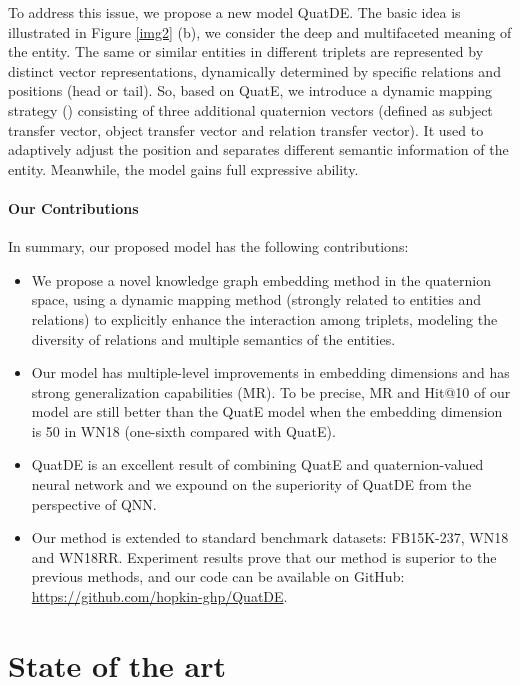 \documentclass[letterpaper]{article} \usepackage{aaai20}  \usepackage{times}  \usepackage{helvet} \usepackage{courier}  \usepackage[hyphens]{url}  \usepackage{graphicx} \usepackage{lineno,hyperref,amsmath,amssymb}
\begin{document}
To address this issue, we propose a new model QuatDE. The basic idea is illustrated in Figure \ref{img2} (b), we consider the deep and multifaceted meaning of the entity. The same or similar entities in different triplets are represented by distinct vector representations, dynamically determined by specific relations and positions (head or tail). So, based on QuatE, we introduce a dynamic mapping strategy () consisting of three additional quaternion vectors (defined as subject transfer vector, object transfer vector and relation transfer vector). It used to adaptively adjust the position and separates different semantic information of the entity. Meanwhile, the model gains full expressive ability.

\paragraph{ \textbf{Our Contributions}}In summary, our proposed model has the following contributions:

\begin{itemize}

\item We propose a novel knowledge graph embedding method in the quaternion space, using a dynamic mapping method (strongly related to entities and relations) to explicitly enhance the interaction among triplets, modeling the diversity of relations and multiple semantics of the entities.
\item Our model has multiple-level improvements in embedding dimensions and has strong generalization capabilities (MR). To be precise, MR and Hit@10 of our model are still better than the QuatE model when the embedding dimension is 50 in WN18 (one-sixth compared with QuatE).
\item QuatDE is an excellent result of combining QuatE and quaternion-valued neural network and we expound on the superiority of QuatDE from the perspective of QNN.
\item Our method is extended to standard benchmark datasets: FB15K-237, WN18 and WN18RR. Experiment results prove that our method is superior to the previous methods, and our code can be available on GitHub: \url{https://github.com/hopkin-ghp/QuatDE}.

\end{itemize}

\section{State of the art}
\end{document}
